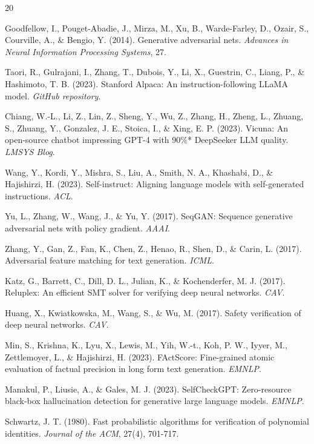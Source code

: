 \documentclass[11pt,a4paper]{article}
\begin{document}

\begin{thebibliography}{20}

Goodfellow, I., Pouget-Abadie, J., Mirza, M., Xu, B., Warde-Farley, D., Ozair, S., Courville, A., \& Bengio, Y. (2014).
Generative adversarial nets.
\textit{Advances in Neural Information Processing Systems}, 27.

Taori, R., Gulrajani, I., Zhang, T., Dubois, Y., Li, X., Guestrin, C., Liang, P., \& Hashimoto, T. B. (2023).
Stanford Alpaca: An instruction-following LLaMA model.
\textit{GitHub repository}.

Chiang, W.-L., Li, Z., Lin, Z., Sheng, Y., Wu, Z., Zhang, H., Zheng, L., Zhuang, S., Zhuang, Y., Gonzalez, J. E., Stoica, I., \& Xing, E. P. (2023).
Vicuna: An open-source chatbot impressing GPT-4 with 90\%* DeepSeeker LLM quality.
\textit{LMSYS Blog}.

Wang, Y., Kordi, Y., Mishra, S., Liu, A., Smith, N. A., Khashabi, D., \& Hajishirzi, H. (2023).
Self-instruct: Aligning language models with self-generated instructions.
\textit{ACL}.

Yu, L., Zhang, W., Wang, J., \& Yu, Y. (2017).
SeqGAN: Sequence generative adversarial nets with policy gradient.
\textit{AAAI}.

Zhang, Y., Gan, Z., Fan, K., Chen, Z., Henao, R., Shen, D., \& Carin, L. (2017).
Adversarial feature matching for text generation.
\textit{ICML}.

Katz, G., Barrett, C., Dill, D. L., Julian, K., \& Kochenderfer, M. J. (2017).
Reluplex: An efficient SMT solver for verifying deep neural networks.
\textit{CAV}.

Huang, X., Kwiatkowska, M., Wang, S., \& Wu, M. (2017).
Safety verification of deep neural networks.
\textit{CAV}.

Min, S., Krishna, K., Lyu, X., Lewis, M., Yih, W.-t., Koh, P. W., Iyyer, M., Zettlemoyer, L., \& Hajishirzi, H. (2023).
FActScore: Fine-grained atomic evaluation of factual precision in long form text generation.
\textit{EMNLP}.

Manakul, P., Liusie, A., \& Gales, M. J. (2023).
SelfCheckGPT: Zero-resource black-box hallucination detection for generative large language models.
\textit{EMNLP}.

Schwartz, J. T. (1980).
Fast probabilistic algorithms for verification of polynomial identities.
\textit{Journal of the ACM}, 27(4), 701-717.

\end{thebibliography}
\end{document}
